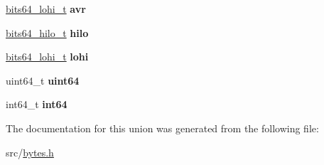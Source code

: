 \begin{DoxyCompactItemize}
\hyperlink{structbits64__lohi__s}{bits64\+\_\+lohi\+\_\+t} {\bfseries avr}
\item 
\hypertarget{unionbits64__s_acd5f277340bd777ff42bcc13c52c6081}{}\label{unionbits64__s_acd5f277340bd777ff42bcc13c52c6081} 
\hyperlink{structbits64__hilo__s}{bits64\+\_\+hilo\+\_\+t} {\bfseries hilo}
\item 
\hypertarget{unionbits64__s_a2d07870fec9fb72486013721a461acc1}{}\label{unionbits64__s_a2d07870fec9fb72486013721a461acc1} 
\hyperlink{structbits64__lohi__s}{bits64\+\_\+lohi\+\_\+t} {\bfseries lohi}
\item 
\hypertarget{unionbits64__s_a82a89fa3451230cc4c2717eeb8c03160}{}\label{unionbits64__s_a82a89fa3451230cc4c2717eeb8c03160} 
uint64\+\_\+t {\bfseries uint64}
\item 
\hypertarget{unionbits64__s_a180519c6f448161cf94b2f4b43555595}{}\label{unionbits64__s_a180519c6f448161cf94b2f4b43555595} 
int64\+\_\+t {\bfseries int64}
\end{DoxyCompactItemize}


The documentation for this union was generated from the following file\+:\begin{DoxyCompactItemize}
\item 
src/\hyperlink{bytes_8h}{bytes.\+h}\end{DoxyCompactItemize}
